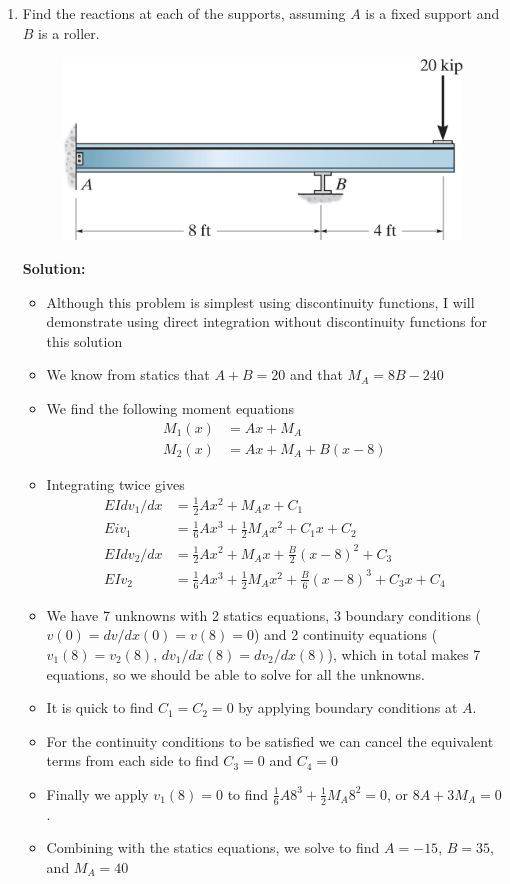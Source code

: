 \documentclass[12pt, oneside]{article}
\begin{document}
\begin{enumerate}
	\item %
		Find the reactions at each of the supports, assuming $A$ is a fixed support and $B$ is a roller.
		\begin{figure}[H]
			\centering
			\includegraphics[width=0.6\linewidth]{12-121}
		\end{figure}
			\textbf{Solution:}
			\begin{itemize}
				\item Although this problem is simplest using discontinuity functions, I will demonstrate using direct integration without discontinuity functions for this solution
				\item We know from statics that $A+B = 20$ and that $M_A = 8B - 240$
				\item We find the following moment equations
					\begin{align*}
						M_1(x) &= Ax + M_A\\
						M_2(x) &= Ax + M_A + B(x-8)
					\end{align*}
				\item Integrating twice gives
					\begin{align*}
						EI dv_1/dx &= \frac{1}{2}Ax^2 + M_A x + C_1\\
						Ei v_1 &= \frac{1}{6}Ax^3 + \frac{1}{2} M_A x^2 + C_1 x + C_2\\
						EI dv_2/dx &=  \frac{1}{2}Ax^2 + M_A x + \frac{B}{2}(x-8)^2 + C_3\\
						EI v_2 &=  \frac{1}{6}Ax^3 + \frac{1}{2} M_A x^2 + \frac{B}{6}(x-8)^3 + C_3x + C_4
					\end{align*}
				\item We have 7 unknowns with 2 statics equations, 3 boundary conditions ($v(0) = dv/dx(0) = v(8) = 0$) and 2 continuity equations ($v_1(8) = v_2(8)$, $dv_1/dx(8) = dv_2/dx(8)$), which in total makes 7 equations, so we should be able to solve for all the unknowns.
				\item It is quick to find $C_1 = C_2 = 0$ by applying boundary conditions at $A$.
				\item For the continuity conditions to be satisfied we can cancel the equivalent terms from each side to find $C_3 = 0$ and $C_4 = 0$
				\item Finally we apply $v_1(8) = 0$ to find $\frac{1}{6} A 8^3 + \frac{1}{2} M_A 8^2 = 0$, or $8A + 3 M_A = 0$.
				\item Combining with the statics equations, we solve to find $A = -15$, $B = 35$, and $M_A = 40$
			\end{itemize}


\end{enumerate}
\end{document}
